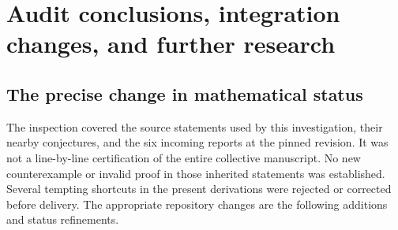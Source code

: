 \section{Audit conclusions, integration changes, and further research}
\label{sec:audit-research}

\subsection{The precise change in mathematical status}

The inspection covered the source statements used by this investigation,
their nearby conjectures, and the six incoming reports at the pinned
revision. It was not a line-by-line certification of the entire collective
manuscript. No new counterexample or invalid proof in those inherited
statements was established. Several tempting shortcuts in the present
derivations were rejected or corrected before delivery. The appropriate
repository changes are the following additions and status refinements.


